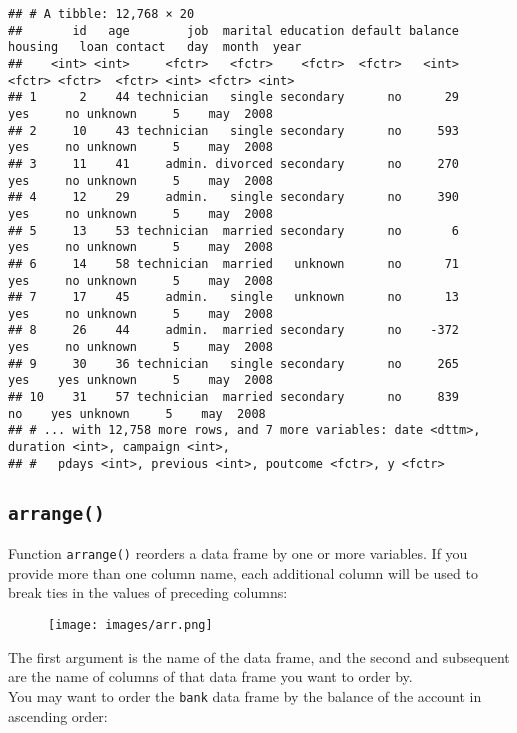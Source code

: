 \documentclass[]{book}
\begin{document}
\begin{verbatim}
## # A tibble: 12,768 × 20
##       id   age        job  marital education default balance housing   loan contact   day  month  year
##    <int> <int>     <fctr>   <fctr>    <fctr>  <fctr>   <int>  <fctr> <fctr>  <fctr> <int> <fctr> <int>
## 1      2    44 technician   single secondary      no      29     yes     no unknown     5    may  2008
## 2     10    43 technician   single secondary      no     593     yes     no unknown     5    may  2008
## 3     11    41     admin. divorced secondary      no     270     yes     no unknown     5    may  2008
## 4     12    29     admin.   single secondary      no     390     yes     no unknown     5    may  2008
## 5     13    53 technician  married secondary      no       6     yes     no unknown     5    may  2008
## 6     14    58 technician  married   unknown      no      71     yes     no unknown     5    may  2008
## 7     17    45     admin.   single   unknown      no      13     yes     no unknown     5    may  2008
## 8     26    44     admin.  married secondary      no    -372     yes     no unknown     5    may  2008
## 9     30    36 technician   single secondary      no     265     yes    yes unknown     5    may  2008
## 10    31    57 technician  married secondary      no     839      no    yes unknown     5    may  2008
## # ... with 12,758 more rows, and 7 more variables: date <dttm>, duration <int>, campaign <int>,
## #   pdays <int>, previous <int>, poutcome <fctr>, y <fctr>
\end{verbatim}

\clearpage

\subsection{\texorpdfstring{\texttt{arrange()}}{arrange()}}\label{arrange}

Function \texttt{arrange()} reorders a data frame by one or more
variables. If you provide more than one column name, each additional
column will be used to break ties in the values of preceding columns:

\begin{figure}[htbp]
\centering
\texttt{[image: images/arr.png]}
\caption{}
\end{figure}

The first argument is the name of the data frame, and the second and
subsequent are the name of columns of that data frame you want to order
by.\\
You may want to order the \texttt{bank} data frame by the balance of the
account in ascending order:
\end{document}
